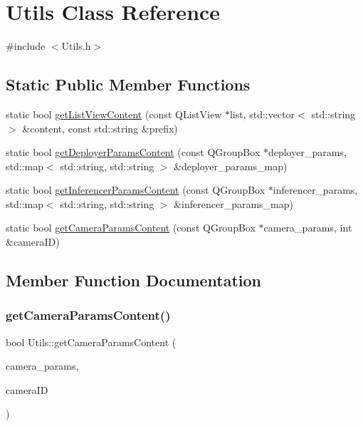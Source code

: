 \hypertarget{class_utils}{}\section{Utils Class Reference}
\label{class_utils}


{\ttfamily \#include $<$Utils.\+h$>$}

\subsection*{Static Public Member Functions}
\begin{DoxyCompactItemize}
\item 
static bool \hyperlink{class_utils_af7234a751d8a81bd01774e9af9e403be}{get\+List\+View\+Content} (const Q\+List\+View $\ast$list, std\+::vector$<$ std\+::string $>$ \&content, const std\+::string \&prefix)
\item 
static bool \hyperlink{class_utils_a67febf7d08f4b9e5e8a105317556c22b}{get\+Deployer\+Params\+Content} (const Q\+Group\+Box $\ast$deployer\+\_\+params, std\+::map$<$ std\+::string, std\+::string $>$ \&deployer\+\_\+params\+\_\+map)
\item 
static bool \hyperlink{class_utils_ae909b1275beb381a21977eb3618d31cd}{get\+Inferencer\+Params\+Content} (const Q\+Group\+Box $\ast$inferencer\+\_\+params, std\+::map$<$ std\+::string, std\+::string $>$ \&inferencer\+\_\+params\+\_\+map)
\item 
static bool \hyperlink{class_utils_a70525e7417b0c195534a64403d25bf13}{get\+Camera\+Params\+Content} (const Q\+Group\+Box $\ast$camera\+\_\+params, int \&camera\+ID)
\end{DoxyCompactItemize}


\subsection{Member Function Documentation}
\mbox{\label{class_utils_a70525e7417b0c195534a64403d25bf13}} 
\subsubsection{\texorpdfstring{get\+Camera\+Params\+Content()}{getCameraParamsContent()}}
{\footnotesize\ttfamily bool Utils\+::get\+Camera\+Params\+Content (\begin{DoxyParamCaption}\item[{const Q\+Group\+Box $\ast$}]{camera\+\_\+params,  }\item[{int \&}]{camera\+ID }\end{DoxyParamCaption})\hspace{0.3cm}{\ttfamily [static]}}

